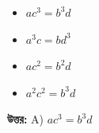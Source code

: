 \documentclass[12pt, a4paper]{article}
\begin{document}
\begin{itemize}[label={}, leftmargin=1cm, itemsep=0.5em]
    \item[\textbf{A)}] $ac^3 = b^3 d$
    \item[\textbf{B)}] $a^3 c = b d^3$
    \item[\textbf{C)}] $ac^2 = b^2 d$
    \item[\textbf{D)}] $a^2 c^2 = b^3 d$
\end{itemize}

\vspace{0.5em}
\begin{tcolorbox}[answerbox]
    \textbf{\color{success} উত্তর:} A) $ac^3 = b^3 d$
\end{tcolorbox}
\vspace{1em}
\end{document}

